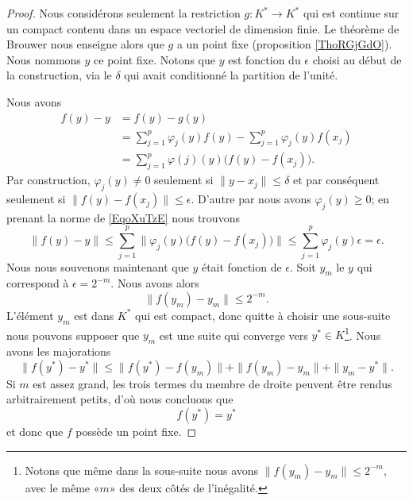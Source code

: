 \begin{proof}
    Nous considérons seulement la restriction \( g\colon K^*\to K^*\) qui est continue sur un compact contenu dans un espace vectoriel de dimension finie. Le théorème de Brouwer nous enseigne alors que \( g\) a un point fixe (proposition \ref{ThoRGjGdO}). Nous nommons \( y\) ce point fixe. Notons que \( y\) est fonction du \( \epsilon\) choisi au début de la construction, via le \( \delta\) qui avait conditionné la partition de l'unité.

    Nous avons
    \begin{subequations}        \label{EqoXuTzE}
        \begin{align}
            f(y)-y&=f(y)-g(y)\\
            &=\sum_{j=1}^p\varphi_j(y)f(y)-\sum_{j=1}^p\varphi_j(y)f(x_j)\\
            &=\sum_{j=1}^p\varphi(j)(y)\big( f(y)-f(x_j) \big).
        \end{align}
    \end{subequations}
    Par construction, \( \varphi_j(y)\neq 0\) seulement si \( \| y-x_j \|\leq \delta\) et par conséquent seulement si \( \| f(y)-f(x_j) \|\leq \epsilon\). D'autre par nous avons \( \varphi_j(y)\geq 0\); en prenant la norme de \eqref{EqoXuTzE} nous trouvons
    \begin{equation}
        \| f(y)-y \|\leq \sum_{j=1}^p\| \varphi_j(y)\big( f(y)-f(x_j) \big) \|\leq \sum_{j=1}^p\varphi_j(y)\epsilon=\epsilon.
    \end{equation}
    Nous nous souvenons maintenant que \( y\) était fonction de \( \epsilon\). Soit \( y_m\) le \( y\) qui correspond à \( \epsilon=2^{-m}\). Nous avons alors
    \begin{equation}
        \| f(y_m)-y_m \|\leq 2^{-m}.
    \end{equation}
    L'élément \( y_m\) est dans \( K^*\) qui est compact, donc quitte à choisir une sous-suite nous pouvons supposer que \( y_m\) est une suite qui converge vers \( y^*\in K\)\footnote{Notons que même dans la sous-suite nous avons \( \| f(y_m)-y_m \|\leq 2^{-m}\), avec le même «\( m\)» des deux côtés de l'inégalité.}. Nous avons les majorations
    \begin{equation}
        \| f(y^*)-y^* \|\leq \| f(y^*)-f(y_m) \|+\| f(y_m)-y_m \|+\| y_m-y^* \|.
    \end{equation}
    Si \( m\) est assez grand, les trois termes du membre de droite peuvent être rendus arbitrairement petits, d'où nous concluons que
    \begin{equation}
        f(y^*)=y^*
    \end{equation}
    et donc que \( f\) possède un point fixe.
\end{proof}


